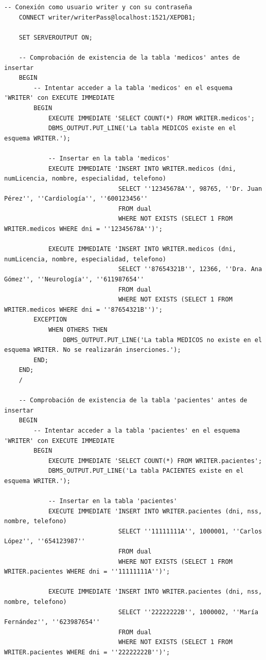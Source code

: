 \documentclass{article}
\begin{document}
\begin{lstlisting}[style=bashStyle]
    -- Conexión como usuario writer y con su contraseña
    CONNECT writer/writerPass@localhost:1521/XEPDB1;
    
    SET SERVEROUTPUT ON;
    
    -- Comprobación de existencia de la tabla 'medicos' antes de insertar
    BEGIN
        -- Intentar acceder a la tabla 'medicos' en el esquema 'WRITER' con EXECUTE IMMEDIATE
        BEGIN
            EXECUTE IMMEDIATE 'SELECT COUNT(*) FROM WRITER.medicos';
            DBMS_OUTPUT.PUT_LINE('La tabla MEDICOS existe en el esquema WRITER.');
    
            -- Insertar en la tabla 'medicos'
            EXECUTE IMMEDIATE 'INSERT INTO WRITER.medicos (dni, numLicencia, nombre, especialidad, telefono)
                               SELECT ''12345678A'', 98765, ''Dr. Juan Pérez'', ''Cardiología'', ''600123456''
                               FROM dual
                               WHERE NOT EXISTS (SELECT 1 FROM WRITER.medicos WHERE dni = ''12345678A'')';
    
            EXECUTE IMMEDIATE 'INSERT INTO WRITER.medicos (dni, numLicencia, nombre, especialidad, telefono)
                               SELECT ''87654321B'', 12366, ''Dra. Ana Gómez'', ''Neurología'', ''611987654''
                               FROM dual
                               WHERE NOT EXISTS (SELECT 1 FROM WRITER.medicos WHERE dni = ''87654321B'')';
        EXCEPTION
            WHEN OTHERS THEN
                DBMS_OUTPUT.PUT_LINE('La tabla MEDICOS no existe en el esquema WRITER. No se realizarán inserciones.');
        END;
    END;
    /
    
    -- Comprobación de existencia de la tabla 'pacientes' antes de insertar
    BEGIN
        -- Intentar acceder a la tabla 'pacientes' en el esquema 'WRITER' con EXECUTE IMMEDIATE
        BEGIN
            EXECUTE IMMEDIATE 'SELECT COUNT(*) FROM WRITER.pacientes';
            DBMS_OUTPUT.PUT_LINE('La tabla PACIENTES existe en el esquema WRITER.');
    
            -- Insertar en la tabla 'pacientes'
            EXECUTE IMMEDIATE 'INSERT INTO WRITER.pacientes (dni, nss, nombre, telefono)
                               SELECT ''11111111A'', 1000001, ''Carlos López'', ''654123987''
                               FROM dual
                               WHERE NOT EXISTS (SELECT 1 FROM WRITER.pacientes WHERE dni = ''11111111A'')';
    
            EXECUTE IMMEDIATE 'INSERT INTO WRITER.pacientes (dni, nss, nombre, telefono)
                               SELECT ''22222222B'', 1000002, ''María Fernández'', ''623987654''
                               FROM dual
                               WHERE NOT EXISTS (SELECT 1 FROM WRITER.pacientes WHERE dni = ''22222222B'')';
    

\end{lstlisting}
\end{document}
